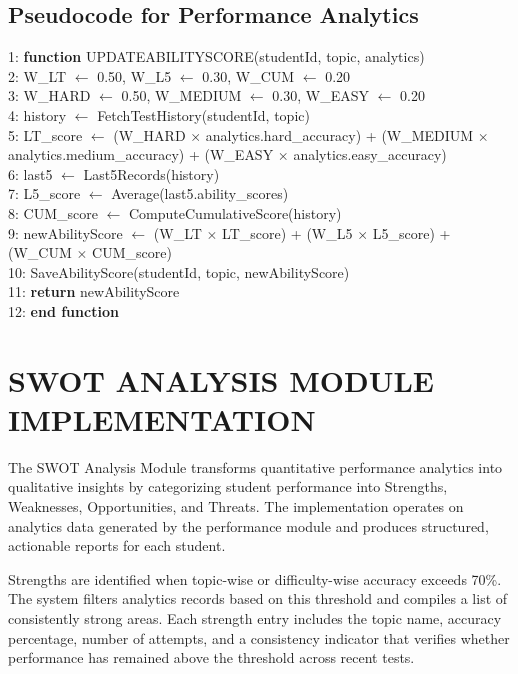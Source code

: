 \begin{sloppypar}
\subsection{Pseudocode for Performance Analytics}

1: \textbf{function} UPDATEABILITYSCORE(studentId, topic, analytics)\\
2: \quad W\_LT $\leftarrow$ 0.50, W\_L5 $\leftarrow$ 0.30, W\_CUM $\leftarrow$ 0.20\\
3: \quad W\_HARD $\leftarrow$ 0.50, W\_MEDIUM $\leftarrow$ 0.30, W\_EASY $\leftarrow$ 0.20\\
4: \quad history $\leftarrow$ FetchTestHistory(studentId, topic)\\
5: \quad LT\_score $\leftarrow$ (W\_HARD $\times$ analytics.hard\_accuracy) + (W\_MEDIUM $\times$ analytics.medium\_accuracy) + (W\_EASY $\times$ analytics.easy\_accuracy)\\
6: \quad last5 $\leftarrow$ Last5Records(history)\\
7: \quad L5\_score $\leftarrow$ Average(last5.ability\_scores)\\
8: \quad CUM\_score $\leftarrow$ ComputeCumulativeScore(history)\\
9: \quad newAbilityScore $\leftarrow$ (W\_LT $\times$ LT\_score) + (W\_L5 $\times$ L5\_score) + (W\_CUM $\times$ CUM\_score)\\
10: \quad SaveAbilityScore(studentId, topic, newAbilityScore)\\
11: \quad \textbf{return} newAbilityScore\\
12: \textbf{end function}
\algofooter

\section{\MakeUppercase{SWOT ANALYSIS MODULE IMPLEMENTATION}}

The SWOT Analysis Module transforms quantitative performance analytics into qualitative insights by categorizing student performance into Strengths, Weaknesses, Opportunities, and Threats. The implementation operates on analytics data generated by the performance module and produces structured, actionable reports for each student.

Strengths are identified when topic-wise or difficulty-wise accuracy exceeds 70\%. The system filters analytics records based on this threshold and compiles a list of consistently strong areas. Each strength entry includes the topic name, accuracy percentage, number of attempts, and a consistency indicator that verifies whether performance has remained above the threshold across recent tests.


\end{sloppypar}
